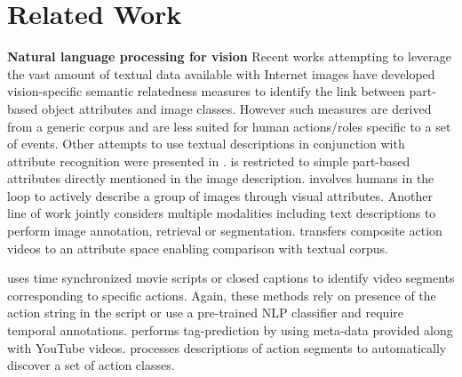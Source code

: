 \documentclass[10pt,twocolumn,letterpaper]{article}
\begin{document}
\section{Related Work}
\noindent \textbf{Natural language processing for vision} 
Recent works attempting to leverage the vast amount of textual data available with Internet images have 
developed vision-specific semantic relatedness measures \cite{Rohrbach_CVPR10, Rohrbach_ECCV10} 
to identify the link between part-based object attributes and image classes. 
However such measures are derived from a generic corpus and are less suited for human actions/roles specific to a set of events. 
Other attempts to use textual descriptions in conjunction with attribute recognition were 
presented in \cite{Berg_ECCV10, Parikh_CVPR11}. 
\cite{Berg_ECCV10} is restricted to simple part-based attributes directly mentioned in the image description. 
\cite{Parikh_CVPR11} involves humans in the loop to actively describe a group of images through visual attributes. 
Another line of work \cite{Jia_ICCV11, Socher_CVPR10} jointly considers multiple modalities including text descriptions to perform image annotation, retrieval or segmentation. 
\cite{Rohrbach_ECCV12}  transfers composite action videos to an attribute space enabling comparison with textual corpus. %

\cite{Laptev_CVPR08, Marszalek_CVPR09, Cour_ECCV08, Everingham_BMVC06} uses time synchronized movie scripts or closed captions to identify video segments corresponding to specific actions. Again, these methods rely on presence of the action string in the script or use a pre-trained NLP classifier \cite{Laptev_CVPR08} and require temporal annotations. \cite{Yang_CVPR11} performs tag-prediction by using meta-data provided along with YouTube videos. \cite{Motwani_ECAI12} processes descriptions of action segments to automatically discover a set of action classes.
\end{document}

